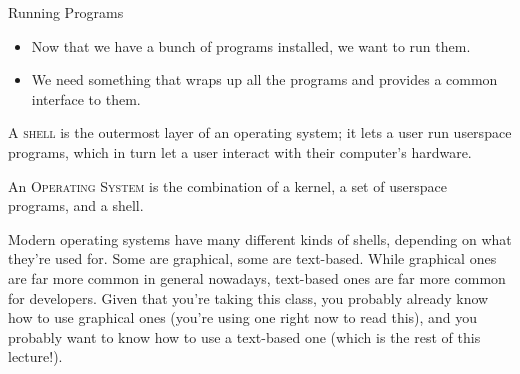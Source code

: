 \begin{frame}{Running Programs}
  \begin{itemize}
    \item
      Now that we have a bunch of programs installed, we want to run them.\pause
    \item
      We need something that wraps up all the programs and provides a common
      interface to them.\pause
  \end{itemize}
  \begin{definition}[shell]
    A \textsc{shell} is the outermost layer of an operating system; it lets a
    user run userspace programs, which in turn let a user interact with their
    computer's hardware.
  \end{definition}
  \pause
  \begin{definition}
    An \textsc{Operating System} is the combination of a kernel, a set of
    userspace programs, and a shell.
  \end{definition}
\end{frame}

Modern operating systems have many different kinds of shells, depending on what
they're used for.  Some are graphical, some are text-based.  While graphical
ones are far more common in general nowadays, text-based ones are far more
common for developers.  Given that you're taking this class, you probably
already know how to use graphical ones (you're using one right now to read
this), and you probably want to know how to use a text-based one (which is the
rest of this lecture!).

